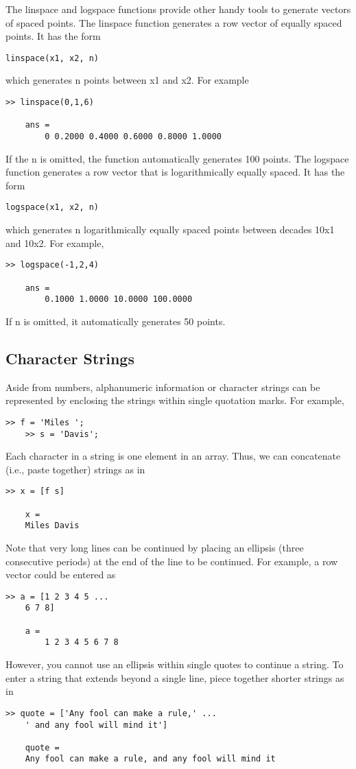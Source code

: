 \documentclass[../main.tex]{subfiles}
\begin{document}
The linspace and logspace functions provide other handy tools to generate vectors of
spaced points. The linspace function generates a row vector of equally spaced points. It
has the form
\begin{lstlisting}[frame=none, numbers=none]
	linspace(x1, x2, n)
\end{lstlisting}
which generates n points between x1 and x2. For example
\begin{lstlisting}[frame=none, numbers=none]
	>> linspace(0,1,6)

	ans =
		0 0.2000 0.4000 0.6000 0.8000 1.0000
\end{lstlisting}
If the n is omitted, the function automatically generates 100 points.
The logspace function generates a row vector that is logarithmically equally spaced.
It has the form
\begin{lstlisting}[frame=none, numbers=none]
	logspace(x1, x2, n)
\end{lstlisting}
which generates n logarithmically equally spaced points between decades 10x1 and 10x2.
For example,
\begin{lstlisting}[frame=none, numbers=none]
	>> logspace(-1,2,4)

	ans =
		0.1000 1.0000 10.0000 100.0000
\end{lstlisting}
If n is omitted, it automatically generates 50 points.

\subsection{Character Strings}

Aside from numbers, alphanumeric information or character strings can be represented by
enclosing the strings within single quotation marks. For example,
\begin{lstlisting}[frame=none, numbers=none]
	>> f = 'Miles ';
	>> s = 'Davis';	
\end{lstlisting}
Each character in a string is one element in an array. Thus, we can concatenate (i.e., paste
together) strings as in
\begin{lstlisting}[frame=none, numbers=none]
	>> x = [f s]

	x =
	Miles Davis
\end{lstlisting}
Note that very long lines can be continued by placing an ellipsis (three consecutive
periods) at the end of the line to be continued. For example, a row vector could be entered as
\begin{lstlisting}[frame=none, numbers=none]
	>> a = [1 2 3 4 5 ...
	6 7 8]

	a =
		1 2 3 4 5 6 7 8
\end{lstlisting}
However, you cannot use an ellipsis within single quotes to continue a string. To enter a
string that extends beyond a single line, piece together shorter strings as in
\begin{lstlisting}[frame=none, numbers=none]
	>> quote = ['Any fool can make a rule,' ...
	' and any fool will mind it']

	quote =
	Any fool can make a rule, and any fool will mind it
\end{lstlisting}
\end{document}
